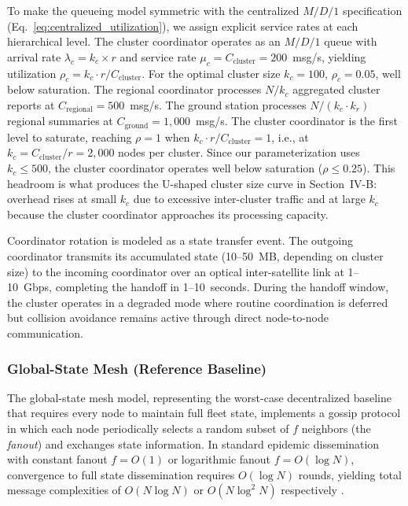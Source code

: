 \documentclass[journal]{IEEEtran}
\begin{document}
To make the queueing model symmetric with the centralized $M/D/1$ specification (Eq.~\ref{eq:centralized_utilization}), we assign explicit service rates at each hierarchical level. The cluster coordinator operates as an $M/D/1$ queue with arrival rate $\lambda_c = k_c \times r$ and service rate $\mu_c = C_{\text{cluster}} = 200$~msg/s, yielding utilization $\rho_c = k_c \cdot r / C_{\text{cluster}}$. For the optimal cluster size $k_c = 100$, $\rho_c = 0.05$, well below saturation. The regional coordinator processes $N/k_c$ aggregated cluster reports at $C_{\text{regional}} = 500$~msg/s. The ground station processes $N/(k_c \cdot k_r)$ regional summaries at $C_{\text{ground}} = 1{,}000$~msg/s. The cluster coordinator is the first level to saturate, reaching $\rho = 1$ when $k_c \cdot r / C_{\text{cluster}} = 1$, i.e., at $k_c = C_{\text{cluster}} / r = 2{,}000$ nodes per cluster. Since our parameterization uses $k_c \leq 500$, the cluster coordinator operates well below saturation ($\rho \leq 0.25$). This headroom is what produces the U-shaped cluster size curve in Section~IV-B: overhead rises at small $k_c$ due to excessive inter-cluster traffic and at large $k_c$ because the cluster coordinator approaches its processing capacity.

Coordinator rotation is modeled as a state transfer event. The outgoing coordinator transmits its accumulated state (10--50~MB, depending on cluster size) to the incoming coordinator over an optical inter-satellite link at 1--10~Gbps, completing the handoff in 1--10~seconds. During the handoff window, the cluster operates in a degraded mode where routine coordination is deferred but collision avoidance remains active through direct node-to-node communication.

\subsubsection{Global-State Mesh (Reference Baseline)}

The global-state mesh model, representing the worst-case decentralized baseline that requires every node to maintain full fleet state, implements a gossip protocol in which each node periodically selects a random subset of $f$ neighbors (the \emph{fanout}) and exchanges state information. In standard epidemic dissemination with constant fanout $f = O(1)$ or logarithmic fanout $f = O(\log N)$, convergence to full state dissemination requires $O(\log N)$ rounds, yielding total message complexities of $O(N \log N)$ or $O(N \log^2 N)$ respectively \cite{demers_gossip}.
\end{document}
